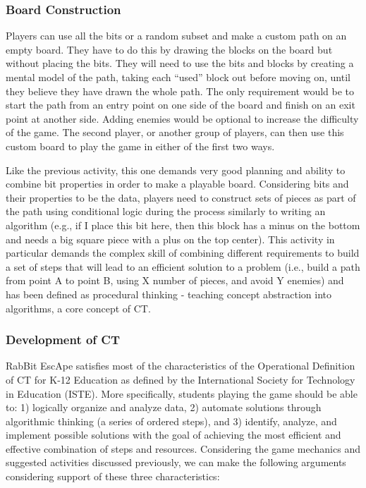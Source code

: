 \documentclass{acm_proc_article-sp}
\begin{document}
\subsubsection{Board Construction}
Players can use all the bits or a random subset and make a custom path on an empty board. They have to do this by drawing the blocks on the board but without placing the bits. They will need to use the bits and blocks by creating a mental model of the path, taking each ``used'' block out before moving on, until they believe they have drawn the whole path. The only requirement would be to start the path from an entry point on one side of the board and finish on an exit point at another side. Adding enemies would be optional to increase the difficulty of the game. The second player, or another group of players, can then use this custom board to play the game in either of the first two ways.

Like the previous activity, this one demands very good planning and ability to combine bit properties in order to make a playable board. Considering bits and their properties to be the data, players need to construct sets of pieces as part of the path using conditional logic during the process similarly to writing an algorithm (e.g., if I place this bit here, then this block has a minus on the bottom and needs a big square piece with a plus on the top center). This activity in particular demands the complex skill of combining different requirements to build a set of steps that will lead to an efficient solution to a problem (i.e., build a path from point A to point B, using X number of pieces, and avoid Y enemies) and has been defined as procedural thinking - teaching concept abstraction into algorithms\cite{papert1980mindstorms}, a core concept of CT\cite{national2010report}.

\subsubsection{Development of CT}
RabBit EscApe satisfies most of the characteristics of the Operational Definition of CT for K-12 Education as defined by the International Society for Technology in Education (ISTE)\cite{operationalct}. 
More specifically, students playing the game should be able to: 1) logically organize and analyze data, 2) automate solutions through algorithmic thinking (a series of ordered steps), and 3) identify, analyze, and implement possible solutions with the goal of achieving the most efficient and effective combination of steps and resources. 
Considering the game mechanics and suggested activities discussed previously, we can make the following arguments considering support of these three characteristics:
\end{document}
